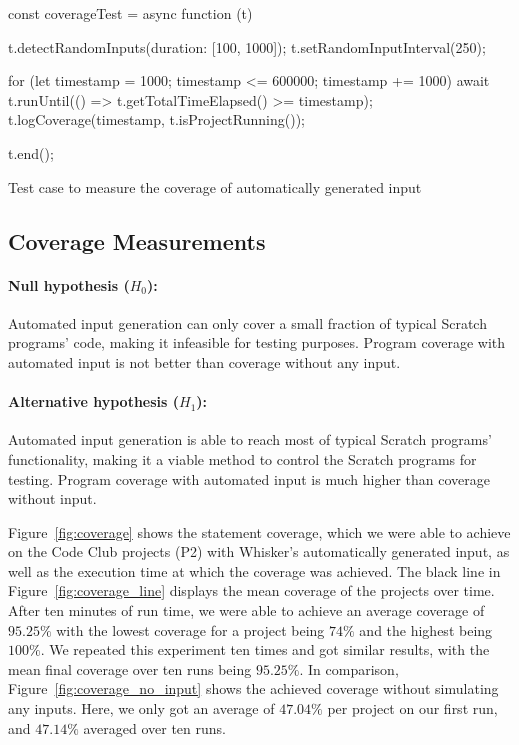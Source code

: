 \begin{listing}[ht]
    \centering

    \begin{minipage}{.9\textwidth}
        \begin{javascriptcode}
            const coverageTest = async function (t) {
                t.detectRandomInputs({duration: [100, 1000]});
                t.setRandomInputInterval(250);

                for (let timestamp = 1000; timestamp <= 600000; timestamp += 1000) {
                    await t.runUntil(() => t.getTotalTimeElapsed() >= timestamp);
                    t.logCoverage(timestamp, t.isProjectRunning());
                }

                t.end();
            }
        \end{javascriptcode}
    \end{minipage}

    \caption{Test case to measure the coverage of automatically generated input}
    \label{lst:coverage_test}
\end{listing}

\subsection{Coverage Measurements}

\paragraph{Null hypothesis ($H_0$):}
Automated input generation can only cover a small fraction of typical Scratch programs' code, making it infeasible for testing purposes.
Program coverage with automated input is not better than coverage without any input.
\paragraph{Alternative hypothesis ($H_1$):}
Automated input generation is able to reach most of typical Scratch programs' functionality, making it a viable method to control the Scratch programs for testing.
Program coverage with automated input is much higher than coverage without input.
\parspace

\noindent Figure~\ref{fig:coverage} shows the statement coverage, which we were able to achieve on the Code Club projects (P2)
with Whisker's automatically generated input,
as well as the execution time at which the coverage was achieved.
The black line in Figure~\ref{fig:coverage_line} displays the mean coverage of the projects over time.
After ten minutes of run time, we were able to achieve an average coverage of $95.25\%$ with the lowest coverage for a project being $74\%$ and the highest being $100\%$.
We repeated this experiment ten times and got similar results, with the mean final coverage over ten runs being $95.25\%$.
In comparison, Figure~\ref{fig:coverage_no_input} shows the achieved coverage without simulating any inputs.
Here, we only got an average of $47.04\%$ per project on our first run, and $47.14\%$ averaged over ten runs.
\parspace

